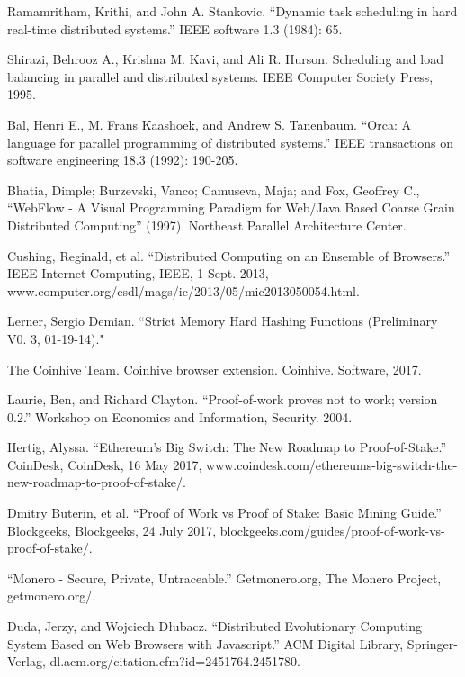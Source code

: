 \documentclass[runningheads]{llncs}
\begin{document}
\begin{thebibliography}{1}
Ramamritham, Krithi, and John A. Stankovic. ``Dynamic task scheduling in hard real-time distributed systems.'' IEEE software 1.3 (1984): 65.

Shirazi, Behrooz A., Krishna M. Kavi, and Ali R. Hurson. Scheduling and load balancing in parallel and distributed systems. IEEE Computer Society Press, 1995.

Bal, Henri E., M. Frans Kaashoek, and Andrew S. Tanenbaum. ``Orca: A language for parallel programming of distributed systems.'' IEEE transactions on software engineering 18.3 (1992): 190-205.

Bhatia, Dimple; Burzevski, Vanco; Camuseva, Maja; and Fox, Geoffrey C., ``WebFlow - A Visual Programming Paradigm for Web/Java Based Coarse Grain Distributed Computing'' (1997).
Northeast Parallel Architecture Center.

 Cushing, Reginald, et al. ``Distributed Computing on an Ensemble of Browsers.'' IEEE Internet Computing, IEEE, 1 Sept. 2013, www.computer.org/csdl/mags/ic/2013/05/mic2013050054.html.

 Lerner, Sergio Demian. ``Strict Memory Hard Hashing Functions (Preliminary V0. 3, 01-19-14)."

The Coinhive Team. Coinhive browser extension. Coinhive. Software, 2017.

Laurie, Ben, and Richard Clayton. ``Proof-of-work proves not to work; version 0.2.'' Workshop on Economics and Information, Security. 2004.

Hertig, Alyssa. ``Ethereum's Big Switch: The New Roadmap to Proof-of-Stake.'' CoinDesk, CoinDesk, 16 May 2017, www.coindesk.com/ethereums-big-switch-the-new-roadmap-to-proof-of-stake/. 

Dmitry Buterin, et al. ``Proof of Work vs Proof of Stake: Basic Mining Guide.'' Blockgeeks, Blockgeeks, 24 July 2017, blockgeeks.com/guides/proof-of-work-vs-proof-of-stake/. 


 ``Monero - Secure, Private, Untraceable.'' Getmonero.org, The Monero Project, getmonero.org/.

 Duda, Jerzy, and Wojciech Dłubacz. ``Distributed Evolutionary Computing System Based on Web Browsers with Javascript.'' ACM Digital Library, Springer-Verlag, dl.acm.org/citation.cfm?id=2451764.2451780.


\end{thebibliography}
\end{document}
